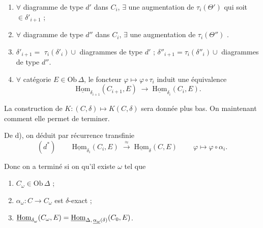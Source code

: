 \documentclass[11pt,a4paper]{article}
\begin{document}
\begin{enumerate}
  \item[$b'$)] $\forall$ diagramme  de type $d'$ dans $C_i$,
    $\exists$ une \struck{\ill{}} augmentation de $\tau_i(\Theta')$ qui soit
    $\in \delta'_{i+1}$ ;
  \item[$b''$)] $\forall$ diagramme  de type $d''$ dans $C_i$,
    $\exists$ une augmentation de $\tau_i(\Theta'')$ .
  \item[c)] $\delta'_{i+1} = $ \struck{\ill{}} $\tau_i(\delta'_i) \cup$
    diagrammes de type $d'$ \struck{\ill{}} ;
    $\delta''_{i+1} = \tau_i(\delta''_i) \cup$ diagrammes de type $d''$.
  \item[d)] $\forall$ catégorie $E \in \mathrm{Ob}\,\Delta$, le foncteur
    $\varphi \mapsto \varphi \circ \tau_i$ induit une équivalence
    \[
      \underline{\mathrm{Hom}}_{\delta_{i+1}}(C_{i+1}, E)
      \;\longrightarrow\;
      \underline{\mathrm{Hom}}_{\delta_i}(C_i, E).
    \]
\end{enumerate}

 La construction de $K : (C,\delta) \mapsto K(C,\delta)$ sera donnée
plus bas. On   maintenant comment elle permet de
terminer.



De d), on déduit par récurrence transfinie
\[
  (d^{*}) \qquad
  \boxed{\ \underline{\mathrm{Hom}}_{\delta_i}(C_i, E)
  \;\xrightarrow{\ \approx\ }\;
  \underline{\mathrm{Hom}}_{\delta}(C, E)\ }
  \qquad \varphi \mapsto \varphi \circ \alpha_i .
\]

Donc on a terminé si on  qu'il existe $\omega$ tel que

\begin{enumerate}
  \item[$1^{\circ}$)] $C_\omega \in \mathrm{Ob}\,\Delta$ ;
  \item[$2^{\circ}$)] $\alpha_\omega : C \to C_\omega$ est $\delta$-exact ;
  \item[$3^{\circ}$)] $\underline{\mathrm{Hom}}_{\delta_\omega}(C_\omega, E)
    = \underline{\mathrm{Hom}}_{\Delta,\, \uncertain{\alpha_\omega}(\delta)}(C_0, E)$.
\end{enumerate}
\end{document}
